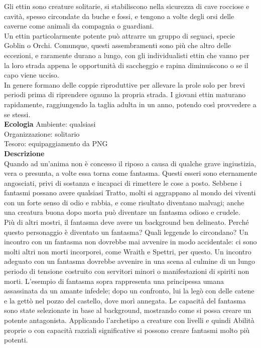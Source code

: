 \begin{multicols}{2}
Gli ettin sono creature solitarie, si stabiliscono nella sicurezza di cave rocciose e cavità, spesso circondate da buche e fossi, e tengono a volte degli orsi delle caverne come animali da compagnia o guardiani.\\
Un ettin particolarmente potente può attrarre un gruppo di seguaci, specie Goblin o Orchi. Comunque, questi assembramenti sono più che altro delle eccezioni, e raramente durano a lungo, con gli individualisti ettin che vanno per la loro strada appena le opportunità di saccheggio e rapina diminuiscono o se il capo viene ucciso.\\
In genere formano delle coppie riproduttive per allevare la prole solo per brevi periodi prima di riprendere ognuno la propria strada. I giovani ettin maturano rapidamente, raggiungendo la taglia adulta in un anno, potendo così provvedere a se stessi.\\

\textbf{Ecologia}
Ambiente: qualsiasi\\
Organizzazione: solitario\\
Tesoro: equipaggiamento da PNG\\
\textbf{Descrizione}\\
Quando ad un'anima non è concesso il riposo a causa di qualche grave ingiustizia, vera o presunta, a volte essa torna come fantasma. Questi esseri sono eternamente angosciati, privi di sostanza e incapaci di rimettere le cose a posto. Sebbene i fantasmi possano avere qualsiasi Tratto, molti si aggrappano al mondo dei viventi con un forte senso di odio e rabbia, e come risultato diventano  malvagi; anche una creatura buona dopo morta può diventare un fantasma odioso e crudele.\\

Più di altri mostri, il fantasma deve avere un background ben delineato. Perché questo personaggio è diventato un fantasma? Quali leggende lo circondano? Un incontro con un fantasma non dovrebbe mai avvenire in modo accidentale: ci sono molti altri non morti incorporei, come Wraith e Spettri, per questo. Un incontro adeguato con un fantasma dovrebbe avvenire in una scena al culmine di un lungo periodo di tensione costruito con servitori minori o manifestazioni di spiriti non morti. L'esempio di fantasma sopra rappresenta una principessa umana assassinata da un amante infedele; dopo un confronto, lui la legò con delle catene e la gettò nel pozzo del castello, dove morì annegata. Le capacità del fantasma sono state selezionate in base al background, mostrando come si possa creare un potente antagonista. Applicando l'archetipo a creature con livelli e quindi Abilità proprie o con capacità razziali significative si possono creare fantasmi molto più potenti.\\


\end{multicols}
